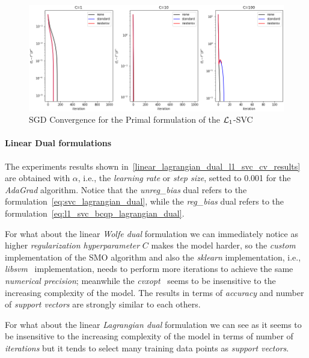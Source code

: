 \begin{figure}[H]
	\centering
	\includegraphics[scale=0.55]{img/l1_svc_loss_history}
	\caption{SGD Convergence for the Primal formulation of the $\protect \mathcal{L}_1$-SVC}
	\label{fig:l1_svc_history}
\end{figure}

\paragraph{Linear Dual formulations}

The experiments results shown in~\ref{linear_lagrangian_dual_l1_svc_cv_results} are obtained with $\alpha$, i.e., the \emph{learning rate} or \emph{step size}, setted to 0.001 for the \emph{AdaGrad} algorithm. Notice that the \emph{unreg\_bias} dual refers to the formulation~\eqref{eq:svc_lagrangian_dual}, while the \emph{reg\_bias} dual refers to the formulation~\eqref{eq:l1_svc_bcqp_lagrangian_dual}.



For what about the linear \emph{Wolfe dual} formulation we can immediately notice as higher \emph{regularization hyperparameter} $C$ makes the model harder, so the \emph{custom} implementation of the SMO algorithm and also the \emph{sklearn} implementation, i.e., \emph{libsvm}~\cite{chang2011libsvm} implementation, needs to perform more iterations to achieve the same \emph{numerical precision}; meanwhile the \emph{cvxopt}~\cite{vandenberghe2010cvxopt} seems to be insensitive to the increasing complexity of the model. The results in terms of \emph{accuracy} and number of \emph{support vectors} are strongly similar to each others.



For what about the linear \emph{Lagrangian dual} formulation we can see as it seems to be insensitive to the increasing complexity of the model in terms of number of \emph{iterations} but it tends to select many training data points as \emph{support vectors}.

